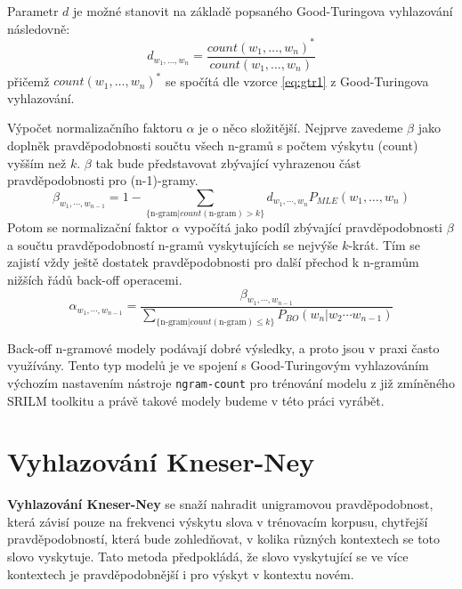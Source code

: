 \documentclass[12pt,a4paper]{report}
\begin{document}
Parametr $d$ je možné stanovit na základě popsaného Good-Turingova vyhlazování následovně:
\begin{equation}
d_{w_1, \ldots, w_n} = \frac{count(w_1, \ldots, w_n)^*}{count(w_1, \ldots, w_n)}
\end{equation}
přičemž $count(w_1, \ldots, w_n)^*$ se spočítá dle vzorce \eqref{eq:gtr1} z Good-Turingova vyhlazování.

Výpočet normalizačního faktoru $\alpha$ je o něco složitější. Nejprve zavedeme $\beta$ jako doplněk pravděpodobnosti součtu všech n-gramů s počtem výskytu (count) vyšším než $k$. $\beta$ tak bude představovat zbývající vyhrazenou část pravděpodobnosti pro (n-1)-gramy.
\begin{equation}
\beta_{w_{1}, \cdots, w_{n-1}} = 1 - \sum_{ \{\text{n-gram} | count(\text{n-gram}) > k \} } d_{w_{1}, \cdots, w_{n}} P_{MLE}(w_1, \ldots, w_n)
\end{equation}
Potom se normalizační faktor $\alpha$ vypočítá jako podíl zbývající pravděpodobnosti $\beta$ a součtu pravděpodobností n-gramů vyskytujících se nejvýše $k$-krát. Tím se zajistí vždy ještě dostatek pravděpodobnosti pro další přechod k n-gramům nižších řádů back-off operacemi.
\begin{equation}
\alpha_{w_{1}, \cdots, w_{n -1}} = \frac{\beta_{w_{1}, \cdots, w_{n -1}}}        {\sum_{ \{ \text{n-gram} | count(\text{n-gram}) \leq k \} } P_{BO}(w_n | w_{2} \cdots w_{n-1})}
\end{equation}

Back-off n-gramové modely podávají dobré výsledky, a proto jsou v praxi často využívány. Tento typ modelů je ve spojení s Good-Turingovým vyhlazováním výchozím nastavením nástroje \texttt{ngram-count} pro trénování modelu z již zmíněného SRILM toolkitu a právě takové modely budeme v této práci vyrábět.

\section{Vyhlazování Kneser-Ney}
\textbf{Vyhlazování Kneser-Ney} se snaží nahradit unigramovou pravděpodobnost, která závisí pouze na frekvenci výskytu slova v trénovacím korpusu, chytřejší pravděpodobností, která bude zohledňovat, v kolika různých kontextech se toto slovo vyskytuje. Tato metoda předpokládá, že slovo vyskytující se ve více kontextech je pravděpodobnější i pro výskyt v kontextu novém.
\end{document}
